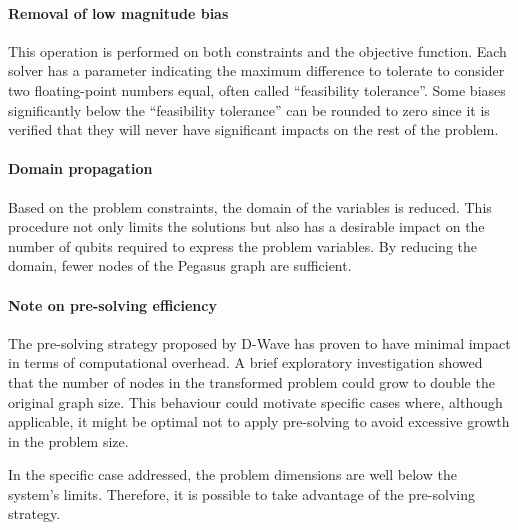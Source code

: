\paragraph{Removal of low magnitude bias} This operation is performed on both constraints and the objective function. Each solver has a parameter indicating the maximum difference to tolerate to consider two floating-point numbers equal, often called ``feasibility tolerance''. Some biases significantly below the ``feasibility tolerance'' can be rounded to zero since it is verified that they will never have significant impacts on the rest of the problem.

\paragraph{Domain propagation} Based on the problem constraints, the domain of the variables is reduced. This procedure not only limits the solutions but also has a desirable impact on the number of qubits required to express the problem variables. By reducing the domain, fewer nodes of the Pegasus graph are sufficient.

\paragraph{Note on pre-solving efficiency} The pre-solving strategy proposed by D-Wave has proven to have minimal impact in terms of computational overhead. A brief exploratory investigation showed that the number of nodes in the transformed problem could grow to double the original graph size. This behaviour could motivate specific cases where, although applicable, it might be optimal not to apply pre-solving to avoid excessive growth in the problem size.

In the specific case addressed, the problem dimensions are well below the system’s limits\cite{hybrid2}. Therefore, it is possible to take advantage of the pre-solving strategy.
